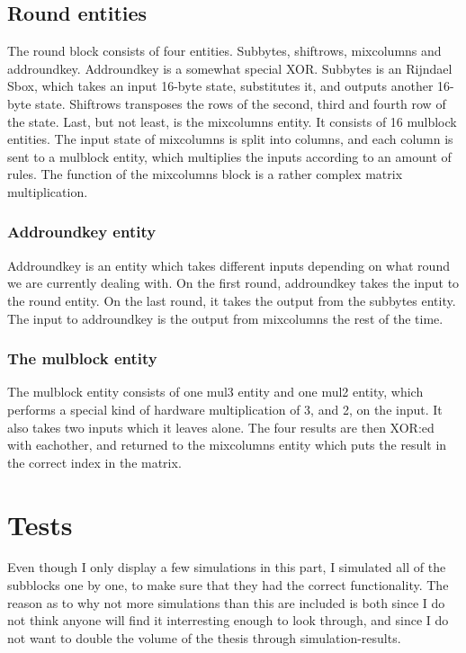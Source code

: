 \subsection{Round entities}
The round block consists of four entities. Subbytes, shiftrows, mixcolumns and 
addroundkey. Addroundkey is a somewhat special XOR. Subbytes is an Rijndael 
Sbox, which takes an input 16-byte state, substitutes it, and outputs another 
16-byte state. Shiftrows transposes the rows of the second, third and fourth 
row of the state. Last, but not least, is the mixcolumns entity. It consists of 
16 mulblock entities. The input state of mixcolumns is split into columns, and 
each column is sent to a mulblock entity, which multiplies the inputs according 
to an amount of rules. The function of the mixcolumns block is a rather complex 
matrix multiplication.

\subsubsection{Addroundkey entity}
Addroundkey is an entity which takes different inputs depending on 
what round we are currently dealing with. On the first round, addroundkey takes 
the input to the round entity. On the last round, it takes the output from the 
subbytes entity. The input to addroundkey is the output from mixcolumns the rest 
of the time.

\subsubsection{The mulblock entity}
The mulblock entity consists of one mul3 entity and one mul2 entity, which 
performs a special kind of hardware multiplication of 3, and 2, on the input. It 
also takes two inputs which it leaves alone. The four results are then XOR:ed 
with eachother, and returned to the mixcolumns entity which puts the result in 
the correct index in the matrix.

\section{Tests}
Even though I only display a few simulations in this part, I simulated all of 
the subblocks one by one, to make sure that they had the correct functionality. 
The reason as to why not more simulations than this are included is both since 
I do not think anyone will find it interresting enough to look through, and since
I do not want to double the volume of the thesis through simulation-results.

